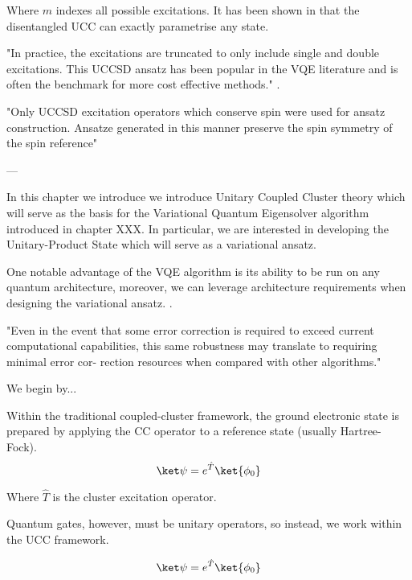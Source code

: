 Where $m$ indexes all possible excitations. It has been shown in \cite{Evangelista2019} that the disentangled UCC can exactly parametrise any state.

"In practice, the excitations are truncated to only include single and double excitations. This UCCSD ansatz has been popular in the VQE literature and is often the benchmark for more cost effective methods." \cite{Chan2021}.

"Only UCCSD excitation operators which conserve spin were
used for ansatz construction. Ansatze generated in this manner
preserve the spin symmetry of the spin reference" \cite{Chan2021}

---

In this chapter we introduce we introduce Unitary Coupled Cluster theory which will serve as the basis for the Variational Quantum Eigensolver algorithm introduced in chapter XXX. In particular, we are interested in developing the Unitary-Product State which will serve as a variational ansatz.



One notable advantage of the VQE algorithm is its ability to be run on any quantum architecture, moreover, we can leverage architecture requirements when designing the variational ansatz. \cite{McClean2016}.

"Even in the event that some error correction is required to exceed current computational capabilities, this same robustness may translate to requiring minimal error cor- rection resources when compared with other algorithms." \cite{McClean2016}

We begin by...



Within the traditional coupled-cluster framework, the ground electronic state is prepared by applying the CC operator to a reference state (usually Hartree-Fock).
\begin{equation*}
    \ket\psi = e^{\hat T} \ket{\phi_0}
\end{equation*}

Where $\hat T$ is the cluster excitation operator.

Quantum gates, however, must be unitary operators, so instead, we work within the UCC framework.

\begin{equation*}
    \ket\psi = e^{\hat T} \ket{\phi_0}
\end{equation*}

